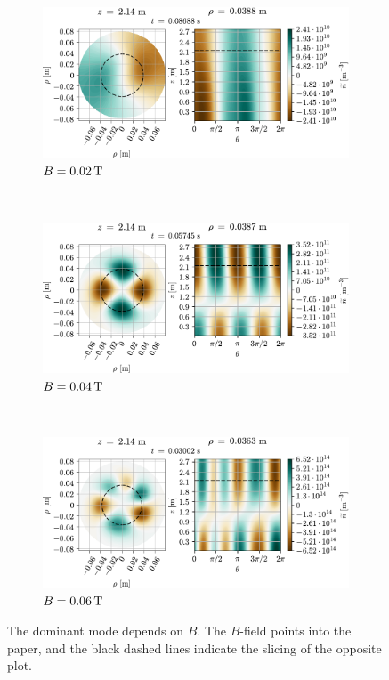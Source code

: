 {
\clearpage
\thispagestyle{empty}
\begin{figure}[htbp]
    \vspace*{-1.5cm}
    \centering
    \begin{subfigure}[h]{1.00\textwidth}
        \centering
        \includegraphics{fig/results/modesDiffScanVals/B002}
        \caption{$B=0.02 \, \text{T}$}
        \label{fig:B002}
    \end{subfigure}%
    \\
    \begin{subfigure}[h]{1.00\textwidth}
        \centering
        \includegraphics{fig/results/modesDiffScanVals/B004}
        \caption{$B=0.04 \, \text{T}$}
        \label{fig:B004}
    \end{subfigure}
    \\
    \begin{subfigure}[h]{1.00\textwidth}
        \centering
        \includegraphics{fig/results/modesDiffScanVals/B006}
        \caption{$B=0.06 \, \text{T}$}
        \label{fig:B006}
    \end{subfigure}
    \caption{The dominant mode depends on $B$.
        The $B$-field points into the paper, and the black dashed lines indicate the slicing of the opposite plot.
    }
    \label{fig:dominatingMode}
\end{figure}
\clearpage
}
%

